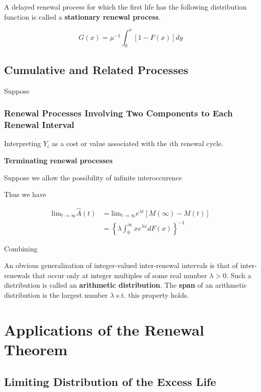 \documentclass[12pt]{article}
\theoremstyle{nonumberbreak}
\begin{document}
A delayed renewal process for which the first life has the following distribution function is called a \textbf{stationary renewal process}. 

$$
G(x) = \mu^{-1} \int_0^x [1 - F(x)] dy
$$



\subsection{Cumulative and Related Processes}

Suppose 

\subsubsection{Renewal Processes Involving Two Components to Each Renewal Interval}

Interpreting $Y_i$ as a cost or value associated with the $i$th renewal cycle. 



\textbf{Terminating renewal processes}

Suppose we allow the possibility of infinite interoccurence 



Thus we have

$$
\begin{aligned}
\mathrm{lim}_{t\to\infty} \hat{A}(t) &= \mathrm{lim}_{t\to\infty} e^{\lambda t} [M(\infty) - M(t) ] \\[8pt]
&= \left\{ \lambda \int_0^\infty x e^{\lambda x} dF(x) \right\}^{-1}
\end{aligned}
$$



Combining 



An obvious generalization of integer-valued inter-renewal intervals is that of inter-renewals that occur only at integer multiples of some real number $\lambda >0$. Such a distribution is called an \textbf{arithmetic distribution}. The \textbf{span} of an arithmetic distribution is the largest number $\lambda$ s.t. this property holds. 






\section{Applications of the Renewal Theorem}

\subsection{Limiting Distribution of the Excess Life}
\end{document}
